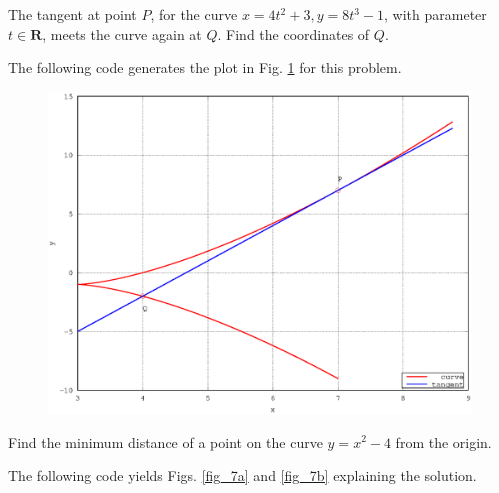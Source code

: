 \documentclass[journal,12pt,twocolumn]{IEEEtran}
\begin{document}
%
\begin{problem}
The tangent at point $P$, for the curve $x = 4t^2+3, y = 8t^3-1$, with parameter $t \in \mathbf{R}$, meets the curve again at $Q$.  Find the coordinates of $Q$.
\end{problem}
\solution 	

The following code generates the plot in Fig. \ref{fig_6} for this problem. 

\begin{figure}[!ht]
\begin{center}
\includegraphics[width=\columnwidth]{./figs/ee16b1006}
\end{center}
\label{fig_6}	
\end{figure}
%
\begin{problem}
Find the minimum distance of a point on the curve $y = x^2 -4$ from the origin.
\end{problem}
\solution

The following code yields Figs. \ref{fig_7a} and \ref{fig_7b} explaining the solution.

\renewcommand{\thefigure}{\theproblem.\arabic{figure}}
\end{document}
